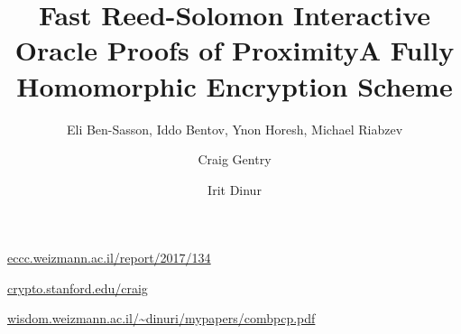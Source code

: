 
\begin{bibliography}
    \title{Fast Reed-Solomon Interactive Oracle Proofs of Proximity}
    \author{Eli Ben-Sasson, Iddo Bentov, Ynon Horesh, Michael Riabzev}
    \url{eccc.weizmann.ac.il/report/2017/134}

    \title{A Fully Homomorphic Encryption Scheme}
    \author{Craig Gentry}
    \url{crypto.stanford.edu/craig}

    \author{Irit Dinur}
    \url{wisdom.weizmann.ac.il/~dinuri/mypapers/combpcp.pdf}

\end{bibliography}